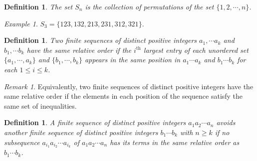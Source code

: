 \documentclass[11pt,letterpaper,twoside,english]{article}
\theoremstyle{theorem}
\newtheorem{definition}[theorem]{Definition}
\theoremstyle{remark}
\newtheorem{remark}{Remark}
\newtheorem{example}{Example}
\begin{document}
\begin{definition}
The set $S_n$ is the collection of permutations of the set $\{1,2,\cdots, n\}$. 
\end{definition}

\begin{example}
$S_3=\{123,132,213,231,312,321\}$. 
\end{example}










\begin{definition}
Two finite sequences of distinct positive integers $a_1,\cdots a_k$ and $b_1,\cdots b_k$ have the same relative order if the $i^\text{th}$ largest entry of each unordered set $\{a_1,\cdots,a_k\}$ and $\{b_1,\cdots, b_k\}$ appears in the same position in $a_1\cdots a_k$ and $b_1\cdots b_k$ for each $1\le i\le k$. 
\end{definition}

\begin{remark}
Equivalently, two finite sequences of distinct positive integers have the same relative order if the elements in each position of the sequence satisfy the same set of inequalities.
\end{remark}

\begin{definition}
A finite sequence of distinct positive integers $a_1a_2\cdots a_n$ avoids another finite sequence of distinct positive integers $b_1\cdots b_k$ with $n\ge k$ if no subsequence $a_{i_1}a_{i_2}\cdots a_{i_k}$ of $a_1a_2\cdots a_n$ has its terms in the same relative order as $b_1\cdots b_k$. 
\end{definition}

\end{document}
